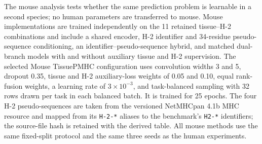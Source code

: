 The mouse analysis tests whether the same prediction problem is learnable in a second species; no human parameters are transferred to mouse. Mouse implementations are trained independently on the 11 retained tissue--H-2 combinations and include a shared encoder, H-2 identifier and 34-residue pseudo-sequence conditioning, an identifier--pseudo-sequence hybrid, and matched dual-branch models with and without auxiliary tissue and H-2 supervision. The selected Mouse TissuePMHC configuration uses convolution widths 3 and 5, dropout 0.35, tissue and H-2 auxiliary-loss weights of 0.05 and 0.10, equal rank-fusion weights, a learning rate of $3\times10^{-3}$, and task-balanced sampling with 32 rows drawn per task in each balanced batch. It is trained for 25 epochs. The four H-2 pseudo-sequences are taken from the versioned NetMHCpan 4.1b MHC resource \cite{reynisson2020netmhcpan} and mapped from its \texttt{H-2-*} aliases to the benchmark's \texttt{H2-*} identifiers; the source-file hash is retained with the derived table. All mouse methods use the same fixed-split protocol and the same three seeds as the human experiments.